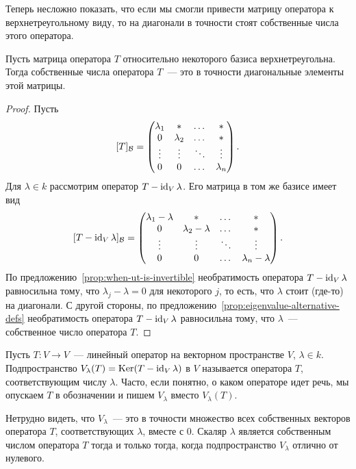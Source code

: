 Теперь несложно показать, что если мы смогли привести матрицу
оператора к верхнетреугольному виду, то на диагонали в точности стоят
собственные числа этого оператора.
\begin{proposition}
Пусть матрица оператора $T$ относительно некоторого базиса
верхнетреугольна. Тогда собственные числа оператора $T$~--- это
в точности диагональные элементы этой матрицы.
\end{proposition}
\begin{proof}
Пусть
$$
[T]_{\mathcal B} = \begin{pmatrix}
\lambda_1 & * & \dots & * \\
0 & \lambda_2 & \dots & * \\
\vdots & \vdots & \ddots & \vdots \\
0 & 0 & \dots & \lambda_n
\end{pmatrix}.
$$
Для $\lambda\in k$ рассмотрим оператор $T - \operatorname{id}_V\lambda$.
Его матрица в том же базисе имеет вид
$$
[T -\operatorname{id}_V\lambda]_{\mathcal B} = \begin{pmatrix}
\lambda_1-\lambda & * & \dots & * \\
0 & \lambda_2-\lambda & \dots & * \\
\vdots & \vdots & \ddots & \vdots \\
0 & 0 & \dots & \lambda_n-\lambda
\end{pmatrix}.
$$
По предложению~\ref{prop:when-ut-is-invertible} необратимость
оператора $T-\operatorname{id}_V\lambda$ равносильна тому, что $\lambda_j-\lambda=0$
для некоторого $j$, то есть, что $\lambda$ стоит (где-то) на диагонали.
С другой стороны, по предложению~\ref{prop:eigenvalue-alternative-defs}
необратимость оператора $T-\operatorname{id}_V\lambda$ равносильна тому, что
$\lambda$~--- собственное число оператора $T$.
\end{proof}

\begin{definition}
Пусть $T\colon V\to V$~--- линейный оператор на векторном пространстве
$V$, $\lambda\in k$. Подпространство
$V_\lambda(T) = \operatorname{Ker}(T-\operatorname{id}_V\lambda)$ в $V$ называется
 оператора $T$, соответствующим
числу $\lambda$. Часто, если понятно, о каком операторе идет речь,
мы опускаем $T$ в обозначении и пишем $V_\lambda$ вместо $V_\lambda(T)$.
\end{definition}

Нетрудно видеть, что $V_\lambda$~--- это в точности множество
всех собственных векторов оператора $T$, соответствующих $\lambda$,
вместе с $0$. Скаляр $\lambda$ является собственным числом
оператора $T$ тогда и только тогда, когда подпространство
$V_\lambda$ отлично от нулевого.

